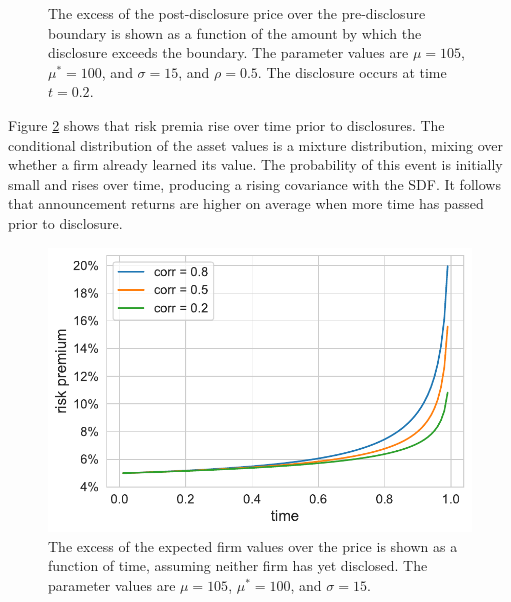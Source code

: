 \documentclass[authoryear,letterpaper,english,12pt]{elsarticle}
\theoremstyle{plain}
\numberwithin{lemma}{section}
\numberwithin{proposition}{section}
\numberwithin{equation}{section}
\numberwithin{figure}{section}
\begin{document}
\begin{figure}[htp]\caption{The excess of the post-disclosure price over the pre-disclosure boundary is shown as a function of the amount by which the disclosure exceeds the boundary.  The parameter values are $\mu=105$, $\mu^*=100$, and $\sigma=15$, and $\rho=0.5$.  The disclosure occurs at time $t=0.2$.\label{fig1}}
\begin{center}
    \end{center}
\end{figure}

Figure \ref{fig2} shows that risk premia rise over time prior to disclosures.  The conditional distribution of the asset values is a mixture distribution, mixing over whether a firm already learned its value.  The probability of this event is initially small and rises over time, producing a rising covariance with the SDF.  It follows that announcement returns are higher on average when more time has passed prior to disclosure.

\begin{figure}[htp]\caption{The excess of the expected firm values over the price is shown as a function of time, assuming neither firm has yet disclosed.    The parameter values are $\mu=105$, $\mu^*=100$, and $\sigma=15$.\label{fig2}}
\begin{center}
    \includegraphics[scale=0.8]{Figures/RiskPremia.pdf}
\end{center}
\end{figure}
\end{document}
